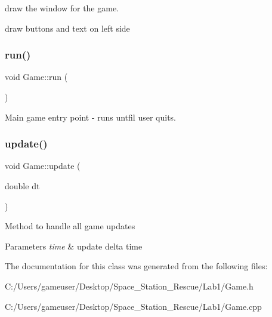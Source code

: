 draw the window for the game.

draw buttons and text on left side \mbox{\label{class_game_a1ab78f5ed0d5ea879157357cf2fb2afa}} 
\subsubsection{\texorpdfstring{run()}{run()}}
{\footnotesize\ttfamily void Game\+::run (\begin{DoxyParamCaption}{ }\end{DoxyParamCaption})}



Main game entry point -\/ runs untfil user quits. 

\mbox{\label{class_game_aa8c8ca9efb596230614be2f2f9e61b86}} 
\subsubsection{\texorpdfstring{update()}{update()}}
{\footnotesize\ttfamily void Game\+::update (\begin{DoxyParamCaption}\item[{double}]{dt }\end{DoxyParamCaption})\hspace{0.3cm}{\ttfamily [private]}}



Method to handle all game updates 


\begin{DoxyParams}{Parameters}
{\em time} & update delta time\\
\hline
\end{DoxyParams}


The documentation for this class was generated from the following files\+:\begin{DoxyCompactItemize}
\item 
C\+:/\+Users/gameuser/\+Desktop/\+Space\+\_\+\+Station\+\_\+\+Rescue/\+Lab1/Game.\+h\item 
C\+:/\+Users/gameuser/\+Desktop/\+Space\+\_\+\+Station\+\_\+\+Rescue/\+Lab1/Game.\+cpp\end{DoxyCompactItemize}
